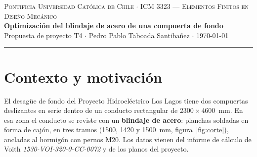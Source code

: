 \documentclass[11pt]{article}
\begin{document}
\begin{center}
  {\scshape\small Pontificia Universidad Cat\'olica de Chile \;$\cdot$\; ICM 3323 --- Elementos Finitos en Dise\~no Mec\'anico}\\[3pt]
  {\Large\bfseries\color{ucred} Optimizaci\'on del blindaje de acero de una compuerta de fondo}\\[2pt]
  {\normalsize Propuesta de proyecto T4 \;$\cdot$\; Pedro Pablo Taboada Santiba\~nez \;$\cdot$\; \today}\\[-2pt]
  {\color{ucred}\rule{\linewidth}{0.6pt}}
\end{center}
\vspace{-6pt}

\section{Contexto y motivaci\'on}

El desag\"ue de fondo del Proyecto Hidroel\'ectrico Los Lagos tiene dos compuertas deslizantes en
serie dentro de un conducto rectangular de $2300\times4600$~mm. En esa zona el conducto se reviste
con un \textbf{blindaje de acero}: planchas soldadas en forma de caj\'on, en tres tramos (1500, 1420 y
1500~mm, figura~\ref{fig:corte}), ancladas al hormig\'on con pernos M20. Los datos vienen del informe
de c\'alculo de Voith \emph{1530-VOI-320-0-CC-0072} y de los planos del proyecto.
\end{document}
